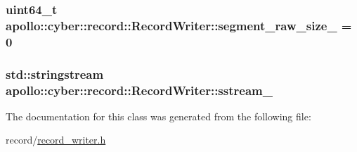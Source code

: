 \hypertarget{classapollo_1_1cyber_1_1record_1_1RecordWriter_a93dde89dc680e3e6bddf15ee9a798619}{
\subsubsection[{segment\-\_\-raw\-\_\-size\-\_\-}]{\setlength{\rightskip}{0pt plus 5cm}uint64\-\_\-t apollo\-::cyber\-::record\-::\-Record\-Writer\-::segment\-\_\-raw\-\_\-size\-\_\- = 0\hspace{0.3cm}{\ttfamily [private]}}}\label{classapollo_1_1cyber_1_1record_1_1RecordWriter_a93dde89dc680e3e6bddf15ee9a798619}
\hypertarget{classapollo_1_1cyber_1_1record_1_1RecordWriter_a6ebe2f54d4185936811d045e0135b513}{
\subsubsection[{sstream\-\_\-}]{\setlength{\rightskip}{0pt plus 5cm}std\-::stringstream apollo\-::cyber\-::record\-::\-Record\-Writer\-::sstream\-\_\-\hspace{0.3cm}{\ttfamily [private]}}}\label{classapollo_1_1cyber_1_1record_1_1RecordWriter_a6ebe2f54d4185936811d045e0135b513}


The documentation for this class was generated from the following file\-:\begin{DoxyCompactItemize}
\item 
record/\hyperlink{record__writer_8h}{record\-\_\-writer.\-h}\end{DoxyCompactItemize}
